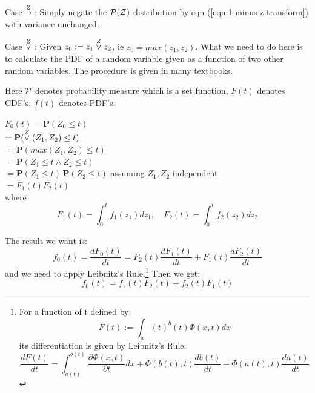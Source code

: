 Case $\stackrel{Z}{\neg}$ :  Simply negate the $\mathcal{P(Z)}$ distribution by eqn (\ref{eqn:1-minus-z-transform}) with variance unchanged.

Case $\stackrel{Z}{\vee}$ :  Given $z_0 := z_1 \stackrel{Z}{\vee} z_2$, ie $z_0 = max(z_1, z_2)$.  What we need to do here is to calculate the PDF of a random variable given as a function of two other random variables.  The procedure is given in many textbooks.

Here $\mathcal{P}$ denotes probability measure which is a set function, $F(t)$ denotes CDF's, $f(t)$ denotes PDF's.


\hspace*{1.2cm} $ F_0(t) = \mathbf{P}(Z_0 \leq t)$\\
\hspace*{2cm} $= \mathbf{P}(\stackrel{Z}{\vee}(Z_1,Z_2) \leq t)$\\
\hspace*{2cm} $= \mathbf{P}(max(Z_1,Z_2) \leq t)$\\
\hspace*{2cm} $= \mathbf{P}(Z_1 \leq t \wedge Z_2 \leq t)$\\
\hspace*{2cm} $= \mathbf{P}(Z_1 \leq t) \, \mathbf{P}(Z_2 \leq t)$ \quad assuming $Z_1, Z_2$ independent\\
\hspace*{2cm} $= F_1(t) F_2(t)$\\
where $$ F_1(t) = \int_0^t f_1(z_1) dz_1 , \quad F_2(t) = \int_0^t f_2(z_2) dz_2$$

The result we want is:
\[ f_0(t) = \frac{dF_0(t)}{dt} = F_2(t) \frac{dF_1(t)}{dt} + F_1(t) \frac{dF_2(t)}{dt} \]
and we need to apply Leibnitz's Rule.\footnote{For a function of t defined by: $$ F(t) := \int_a(t)^b(t) \Phi(x,t) dx $$ its differentiation is given by Leibnitz's Rule: $$ \frac{dF(t)}{dt} = \int_{a(t)}^{b(t)} \frac{\partial\Phi(x,t)}{\partial t} dx + \Phi(b(t),t) \frac{db(t)}{dt} - \Phi(a(t),t) \frac{da(t)}{dt} $$ }  Then we get:
\begin{equation}
f_0(t) = f_1(t) F_2(t) + f_2(t) F_1(t)
\end{equation}

